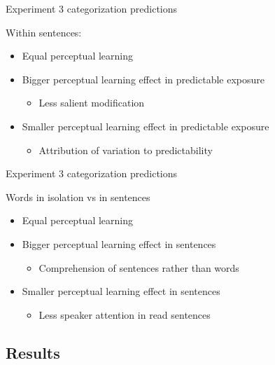 \documentclass{beamer}
\begin{document}
\begin{frame}{Experiment 3 categorization predictions}

Within sentences:
\begin{itemize}
\item Equal perceptual learning 
\item Bigger perceptual learning effect in predictable exposure
\begin{itemize}
\item Less salient modification
\end{itemize}
\item Smaller perceptual learning effect in predictable exposure
\begin{itemize}
\item Attribution of variation to predictability
\end{itemize}
\end{itemize}
\end{frame}

\begin{frame}{Experiment 3 categorization predictions}

Words in isolation vs in sentences
\begin{itemize}
\item Equal perceptual learning
\item Bigger perceptual learning effect in sentences
\begin{itemize}
\item Comprehension of sentences rather than words
\end{itemize}
\item Smaller perceptual learning effect in sentences
\begin{itemize}
\item Less speaker attention in read sentences
\end{itemize}
\end{itemize}
\end{frame}

\subsection{Results}
\end{document}
